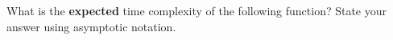 \begin{prob}
    What is the \textbf{expected} time complexity of the following function?
    State your answer using asymptotic notation.

    \inputminted[lastline=11]{python}{code.py}


\end{prob}
